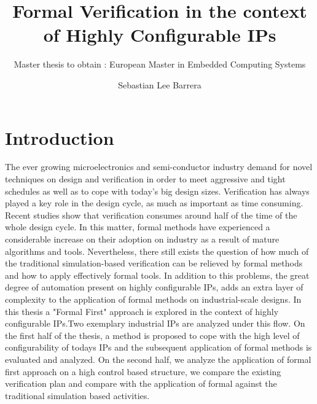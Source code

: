 \documentclass[a4paper,11pt]{article}
\begin{document}
\title{Formal Verification in the context of Highly Configurable IPs}
\subtitle{Master thesis to obtain : European Master in Embedded Computing Systems}
\author{Sebastian Lee Barrera}

\maketitle



%

\section{Introduction}
The ever growing microelectronics and semi-conductor industry demand for novel  techniques on design and verification in order to meet aggressive and tight schedules as well as to cope with today's big design sizes.
Verification has always played a key role in the design cycle, as much as important as time consuming. Recent studies show that verification consumes around half of the time of the whole design cycle. In this matter, formal methods have experienced a considerable increase on their adoption on industry as a result of mature algorithms and tools. Nevertheless, there still exists the question of how much of the traditional simulation-based verification can be relieved by formal methods and how to apply effectively formal tools. In addition to this problems, the great degree of automation present on highly configurable IPs, adds an extra layer of complexity to the application of formal methods on industrial-scale designs. In this thesis a "Formal First" approach is explored in the context of highly configurable IPs.Two exemplary industrial IPs are analyzed under this flow. On the first half of the thesis, a method is proposed to cope with the high level of configurability of todays IPs and the subsequent application of formal methods is evaluated and analyzed. On the second half, we analyze the application of formal first approach on a high control based structure, we compare the existing verification plan and compare with the application of formal against the traditional simulation based activities. 
\end{document}
